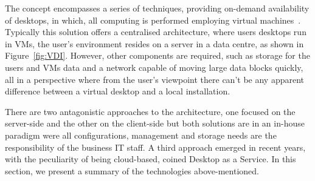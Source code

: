 The concept encompasses a series of techniques, providing on-demand availability of desktops, in which, all computing is performed employing virtual machines~\cite{VMWare_VDI2006}.
Typically this solution offers a centralised architecture, where users desktops run in VMs, the user's environment resides on a server in a data centre, as shown in Figure~\ref{fig:VDI}. However, other components are required, such as storage for the users and VMs data and a network capable of moving large data blocks quickly, all in a perspective where from the user's viewpoint there can't be any apparent difference between a virtual desktop and a local installation.

There are two antagonistic approaches to the architecture, one focused on the server-side and the other on the client-side but both solutions are in an in-house paradigm were all configurations, management and storage needs are the responsibility of the business IT staff. A third approach emerged in recent years, with the peculiarity of being cloud-based, coined Desktop as a Service.
In this section, we present a summary of the technologies above-mentioned.

